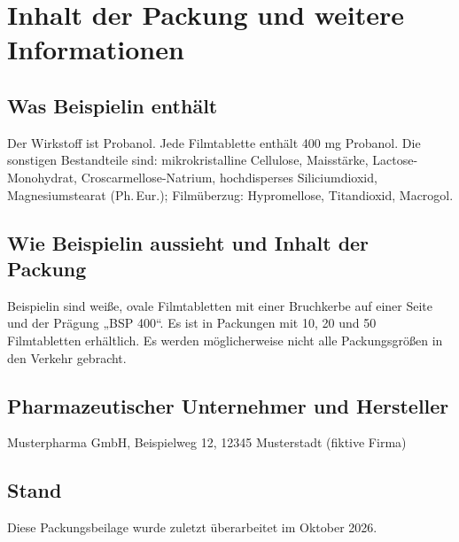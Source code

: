 \documentclass[9.5pt,a4paper]{extarticle}
\begin{document}
\section{Inhalt der Packung und weitere Informationen}
\subsection*{Was Beispielin enthält}
Der Wirkstoff ist Probanol. Jede Filmtablette enthält 400 mg Probanol. Die sonstigen Bestandteile sind:
mikrokristalline Cellulose, Maisstärke, Lactose-Monohydrat, Croscarmellose-Natrium, hochdisperses Siliciumdioxid,
Magnesiumstearat (Ph.\,Eur.); Filmüberzug: Hypromellose, Titandioxid, Macrogol.

\subsection*{Wie Beispielin aussieht und Inhalt der Packung}
Beispielin sind weiße, ovale Filmtabletten mit einer Bruchkerbe auf einer Seite und der Prägung „BSP 400“. Es ist in
Packungen mit 10, 20 und 50 Filmtabletten erhältlich. Es werden möglicherweise nicht alle Packungsgrößen in den
Verkehr gebracht.

\subsection*{Pharmazeutischer Unternehmer und Hersteller}
Musterpharma GmbH, Beispielweg 12, 12345 Musterstadt (fiktive Firma)

\subsection*{Stand}
Diese Packungsbeilage wurde zuletzt überarbeitet im Oktober 2026.
\end{document}
